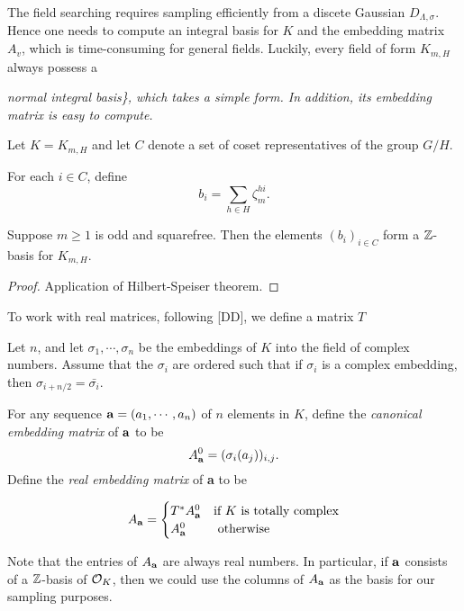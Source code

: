 \documentclass{amsart}
\begin{document}
The field searching requires sampling efficiently from a discete Gaussian $D_{\Lambda, \sigma}$. Hence one needs to compute an integral basis for $K$ and the embedding matrix $A_v$, which is time-consuming for general fields.  Luckily, every field of form $K_{m,H}$ always possess a {\it normal integral basis\}, which takes a simple form. In addition, its embedding matrix is easy to compute.


Let $K = K_{m,H}$ and let $C$ denote a set of coset representatives of the group $G/H$.

\begin{Definition}
For each $i \in C$, define
\[
    b_i =  \sum_{h \in H} \zeta_m^{hi}.
\]
\end{Definition}

\begin{Prop}
Suppose $m \geq 1$ is odd and squarefree. Then the elements
$(b_i)_{i \in C}$ form a $\mathbb{Z}$-basis for $K_{m,H}$.
\end{Prop}

\begin{proof}
Application of Hilbert-Speiser theorem.
\end{proof}




To work with real matrices, following [DD], we define a matrix $T$
\begin{Definition}


\end{Definition}



Let  $n$, and let $\sigma_1, \cdots,\sigma_n$ be the embeddings of $K$ into the field of complex numbers. Assume that the $\sigma_i$ are ordered such that if $\sigma_i$ is a complex embedding, then $\sigma_{i+n/2} = \bar{\sigma_i}$.

\begin{Definition}
 For any sequence ${\bf a} = (a_1, \cdots, a_n)$  of $n$ elements in $K$, define the {\em canonical embedding matrix} of ${\bf a}$ to be
\[
    A_{\bf a}^0 = (\sigma_i(a_j))_{i,j}.
\]
Define the {\em real embedding matrix} of {\bf a} to be

$$A_{\bf a} =  \begin{cases} T^*A_{\bf a}^0 &\mbox{if } K \mbox{ is totally complex} \\
 A_{\bf a}^0 & \mbox{ otherwise}  \end{cases}$$
\end{Definition}

Note that the entries of $A_{\bf a}$ are always real numbers. In particular, if ${\bf a}$ consists of a $\mathbb{Z}$-basis of $\mathcal{O}_K$, then we could use the columns of $A_{\bf a}$ as the basis for our sampling purposes.


}
\end{document}

